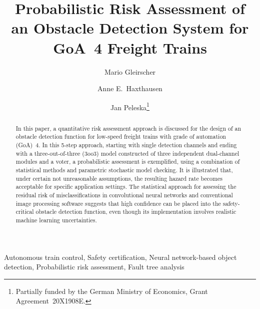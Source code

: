 \documentclass[runningheads,a4paper]{llncs}
\newcommand{\keywords}[1]{\par\addvspace\baselineskip
\noindent\keywordname\enspace\ignorespaces#1}
\begin{document}
\mainmatter  %

\title{Probabilistic Risk Assessment of an Obstacle Detection System for  GoA~4 Freight Trains}


\author{
Mario Gleirscher \and
   Anne E.~Haxthausen \and 
   Jan Peleska\thanks{Partially funded by the German Ministry of Economics,
      Grant Agreement~20X1908E.} 
}


 

\maketitle

\begin{abstract}
  In this paper, a quantitative risk assessment approach is discussed
  for the design of an obstacle detection function for low-speed
  freight trains with grade of automation (GoA)~4.  In this 5-step
  approach, starting with single detection channels and ending with a
  three-out-of-three (3oo3) model constructed of three independent
  dual-channel modules and a voter, a probabilistic assessment is
  exemplified, using a combination of statistical methods and
  parametric stochastic model checking. It is illustrated that, under
  certain not unreasonable assumptions, the resulting hazard rate
  becomes acceptable for specific application settings.
  The statistical approach for assessing the residual risk of
  misclassifications in convolutional neural networks and conventional
  image processing software suggests that high confidence can be
  placed into the safety-critical obstacle detection function, even
  though its implementation involves realistic machine learning
  uncertainties.
\end{abstract}
\keywords{
Autonomous train control,
Safety certification,
Neural network-based object detection,
Probabilistic risk assessment,
Fault tree analysis}
\end{document}
